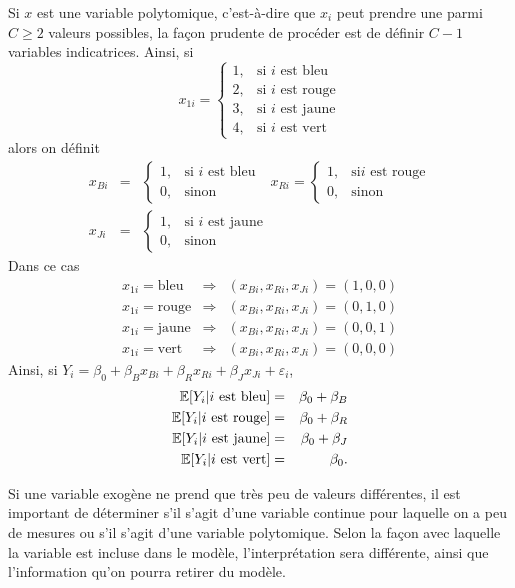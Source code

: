 Si $x$ est une variable polytomique, c'est-à-dire que $x_i$ peut
prendre une parmi $C\ge2$ valeurs possibles, la fa\c{c}on prudente
de procéder est de définir $C-1$ variables indicatrices.
Ainsi,
si $$x_{1i}=\left\{\begin{array}{ll} 1, & \mbox{si $i$ est bleu}\\
2, & \mbox{si $i$ est rouge}\\ 3, & \mbox{si $i$ est jaune}\\ 4, &
\mbox{si $i$ est vert}\end{array}\right.$$ alors on définit
\begin{eqnarray*}
x_{Bi}&=&\left\{\begin{array}{ll}1, & \mbox{si $i$ est bleu}\\ 0,
& \mbox{sinon}\end{array}\right.\ \ \
x_{Ri}=\left\{\begin{array}{ll}1, & \mbox{si
$i$ est rouge}\\ 0, & \mbox{sinon}\end{array}\right.\\
x_{Ji}&=&\left\{\begin{array}{ll}1, & \mbox{si $i$ est jaune}\\
0, & \mbox{sinon}\end{array}\right.\end{eqnarray*} Dans ce cas
\begin{eqnarray*}
x_{1i}=\mbox{bleu}&\Rightarrow&(x_{Bi},x_{Ri},x_{Ji})=(1,0,0)\\
x_{1i}=\mbox{rouge}&\Rightarrow&(x_{Bi},x_{Ri},x_{Ji})=(0,1,0)\\
x_{1i}=\mbox{jaune}&\Rightarrow&(x_{Bi},x_{Ri},x_{Ji})=(0,0,1)\\
x_{1i}=\mbox{vert}&\Rightarrow&(x_{Bi},x_{Ri},x_{Ji})=(0,0,0)
\end{eqnarray*}
Ainsi, si
$Y_i=\beta_0+\beta_{B}x_{Bi}+\beta_Rx_{Ri}+\beta_Jx_{Ji}+\varepsilon_i$,
\begin{eqnarray*}
\mathbb{E}[Y_i|\mbox{$i$ est bleu}]&=&\beta_0+\beta_B\\
\mathbb{E}[Y_i|\mbox{$i$ est rouge}]&=&\beta_0+\beta_R\\
\mathbb{E}[Y_i|\mbox{$i$ est jaune}]&=&\beta_0+\beta_J\\
\mathbb{E}[Y_i|\mbox{$i$ est vert}]&=&\beta_0.
\end{eqnarray*}


\begin{remarque}
Si une variable exogène ne prend que très peu de valeurs différentes, il est important de déterminer s'il s'agit d'une variable continue pour laquelle on a peu de mesures ou s'il
s'agit d'une variable polytomique. Selon la façon avec laquelle la variable est incluse dans le modèle, l'interprétation sera différente, ainsi que l'information qu'on pourra retirer du modèle.
\end{remarque}

